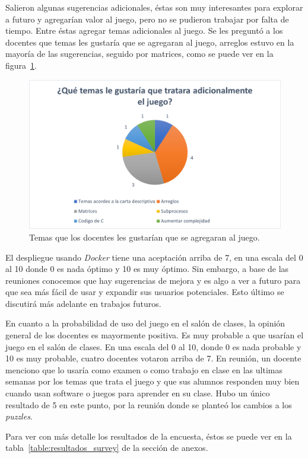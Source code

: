 Salieron algunas sugerencias adicionales, éstas son muy interesantes para explorar a futuro y agregarían valor al juego, pero no se pudieron trabajar por falta de tiempo. Entre éstas agregar temas adicionales al juego. Se les preguntó a los docentes que temas les gustaría que se agregaran al juego, arreglos estuvo en la mayoría de las sugerencias, seguido por matrices, como se puede ver en la figura~\ref{fig:temas_extras}. 

\begin{figure}[H]
    \centering
    \includegraphics[width=0.8\linewidth]{images/Temas a agregar.png}
    \caption{Temas que los docentes les gustarían que se agregaran al juego.}
    \label{fig:temas_extras}
\end{figure}

El despliegue usando \textit{Docker} tiene una aceptación arriba de 7, en una escala del 0 al 10 donde 0 es nada óptimo y 10 es muy óptimo. Sin embargo, a base de las reuniones conocemos que hay sugerencias de mejora y es algo a ver a futuro para que sea más fácil de usar y expandir sus usuarios potenciales. Esto último se discutirá más adelante en trabajos futuros.

En cuanto a la probabilidad de uso del juego en el salón de clases, la opinión general de los docentes es mayormente positiva. Es muy probable a que usarían el juego en el salón de clases. En una escala del 0 al 10, donde 0 es nada probable y 10 es muy probable, cuatro docentes votaron arriba de 7. En reunión, un docente menciono que lo usaría como examen o como trabajo en clase en las ultimas semanas por los temas que trata el juego y que sus alumnos responden muy bien cuando usan software o juegos para aprender en su clase. Hubo un único resultado de 5 en este punto, por la reunión donde se planteó los cambios a los \textit{puzzles}.

Para ver con más detalle los resultados de la encuesta, éstos se puede ver en la tabla~\ref{table:resultados_survey} de la sección de anexos.
